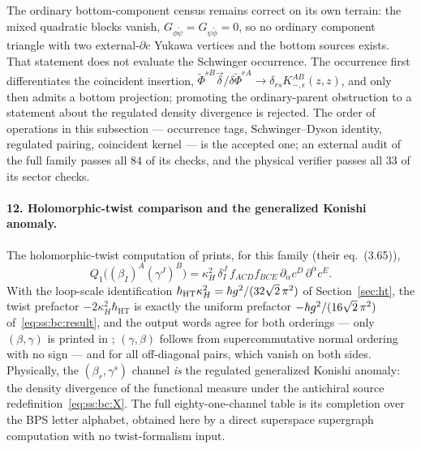 \begin{remark}\label{rem:ss:bc:olderror}
The ordinary bottom-component census remains correct on its own terrain: the
mixed quadratic blocks vanish,
$G_{\phi\widetilde\psi}=G_{\psi\widetilde\phi}=0$, so no ordinary component
triangle with two external-$\partial c$ Yukawa vertices and the bottom sources
exists. That statement does not evaluate the Schwinger occurrence. The
occurrence first differentiates the coincident insertion,
$\widetilde\Phi^{sB}\vec\delta/\delta\widetilde\Phi^{rA}
\to\delta_{rs}K_{-,\epsilon}^{AB}(z,z)$, and only then admits a bottom
projection; promoting the ordinary-parent obstruction to a statement about the
regulated density divergence is rejected. The order of operations in this
subsection --- occurrence tags, Schwinger--Dyson identity, regulated pairing,
coincident kernel --- is the accepted one; an external audit of the full
family passes all $84$ of its checks, and the physical verifier passes all
$33$ of its sector checks.
\end{remark}

\paragraph{12. Holomorphic-twist comparison and the generalized Konishi
anomaly.}
The holomorphic-twist computation of \cite{BK} prints, for this family (their
eq.~(3.65)),
\begin{equation}\label{eq:ss:bc:bk}
Q_{1}\big((\beta_{I})^{A}(\gamma^{J})^{B}\big)
=\kappa_{H}^{2}\,\delta^{J}_{I}\,f_{ACD}f_{BCE}\,
\partial_{\dot\alpha}c^{D}\,\partial^{\dot\alpha}c^{E} .
\end{equation}
With the loop-scale identification
$\hbar_{\mathrm{HT}}\kappa_{H}^{2}=\hbar g^{2}/(32\sqrt2\,\pi^{2})$ of
Section~\ref{sec:ht}, the twist prefactor $-2\kappa_{H}^{2}\hbar_{\mathrm{HT}}$
is exactly the uniform prefactor $-\hbar g^{2}/(16\sqrt2\,\pi^{2})$
of~\eqref{eq:ss:bc:result}, and the output words agree for both orderings ---
only $(\beta,\gamma)$ is printed in \cite{BK}; $(\gamma,\beta)$ follows from
supercommutative normal ordering with no sign --- and for all off-diagonal
pairs, which vanish on both sides. Physically, the $(\beta_r,\gamma^s)$
channel \emph{is} the regulated generalized Konishi anomaly: the density
divergence of the functional measure under the antichiral source
redefinition~\eqref{eq:ss:bc:X}. The full eighty-one-channel table is its
completion over the BPS letter alphabet, obtained here by a direct superspace
supergraph computation with no twist-formalism input.


